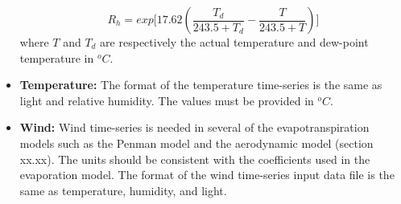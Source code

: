 \begin{itemize}
\begin{equation}
\label{eq:6}
R_h=exp\big[17.62(\frac{T_d}{243.5+T_d}-\frac{T}{243.5+T}) \big]
\end{equation}
where $T$ and $T_d$ are respectively the actual temperature and dew-point temperature in $^oC$. %
\item %
\textbf{Temperature: } The format of the temperature time-series is the same as light and relative humidity. The values must be provided in $^oC$. %
\item %
\textbf{Wind: } Wind time-series is needed in several of the evapotranspiration models such as the Penman model and the aerodynamic model (section xx.xx). The units should be consistent with the coefficients used in the evaporation model. The format of the wind time-series input data file is the same as temperature, humidity, and light. %
\end{itemize}
